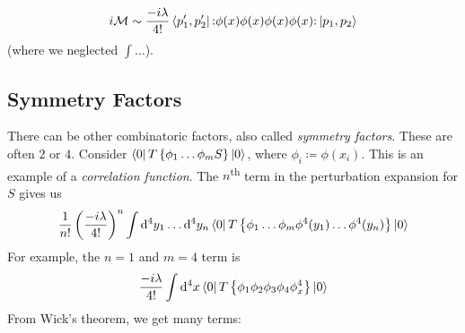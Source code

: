 \begin{example}[$\phi\phi \to \phi\phi$]
  \begin{equation}
    i \mathcal{M} \sim \frac{-i \lambda}{4!} \bra{p_1', p_2'} \mathop{:}\nolimits\!\phi(x) \phi(x) \phi(x) \phi(x)\!\mathop{:}\nolimits \ket{ p_1, p_2}
  \end{equation}
  (where we neglected $\int \dots$).
\end{example}

\subsection{Symmetry Factors}%
\label{sub:combinatoric_factors}

There can be other combinatoric factors, also called \emph{symmetry factors}. These are often $2$ or $4$.
Consider $\bra{0} T \left\{ \phi_1 \dots \phi_m S \right\} \ket{0}$, where $\phi_i \coloneqq \phi(x_i)$.
This is an example of a \emph{correlation function}.
The $n$\textsuperscript{th} term in the perturbation expansion for $S$ gives us 
\begin{equation}
  \frac{1}{n!} \left( \frac{-i\lambda}{4!} \right)^n \int \dd[4]{y_1} \dots \dd[4]{y_n} \bra{0} T \left\{ \phi_1 \dots \phi_m \phi^4 (y_1) \dots \phi^4 (y_n) \right\} \ket{0}
\end{equation}
For example, the $n = 1$ and $m = 4$ term is
\begin{equation}
  \frac{-i\lambda}{4!} \int \dd[4]{x} \bra{0} T \left\{ \phi_1\phi_2\phi_3\phi_4 \phi^4_x \right\} \ket{0}
\end{equation}
From Wick's theorem, we get many terms:
